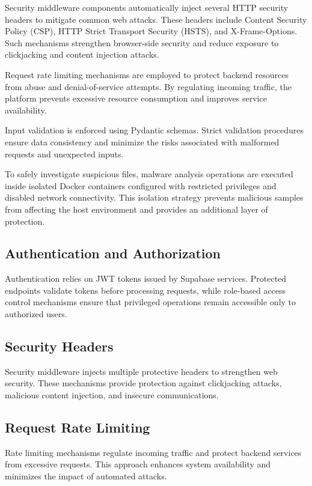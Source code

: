 Security middleware components automatically inject several HTTP security headers to mitigate common web attacks. These headers include Content Security Policy (CSP), HTTP Strict Transport Security (HSTS), and X-Frame-Options. Such mechanisms strengthen browser-side security and reduce exposure to clickjacking and content injection attacks.

Request rate limiting mechanisms are employed to protect backend resources from abuse and denial-of-service attempts. By regulating incoming traffic, the platform prevents excessive resource consumption and improves service availability.

Input validation is enforced using Pydantic schemas. Strict validation procedures ensure data consistency and minimize the risks associated with malformed requests and unexpected inputs.

To safely investigate suspicious files, malware analysis operations are executed inside isolated Docker containers configured with restricted privileges and disabled network connectivity. This isolation strategy prevents malicious samples from affecting the host environment and provides an additional layer of protection.

\subsection{Authentication and Authorization}
Authentication relies on JWT tokens issued by Supabase services. Protected endpoints validate tokens before processing requests, while role-based access control mechanisms ensure that privileged operations remain accessible only to authorized users.

\subsection{Security Headers}
Security middleware injects multiple protective headers to strengthen web security. These mechanisms provide protection against clickjacking attacks, malicious content injection, and insecure communications.

\subsection{Request Rate Limiting}
Rate limiting mechanisms regulate incoming traffic and protect backend services from excessive requests. This approach enhances system availability and minimizes the impact of automated attacks.

